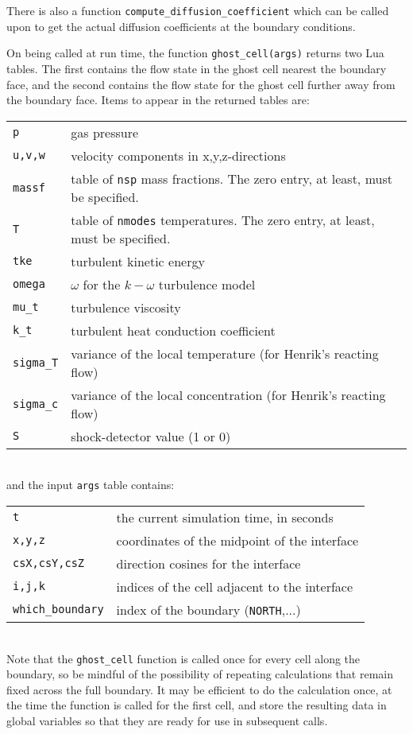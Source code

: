 \noindent
There is also a function \texttt{compute\_diffusion\_coefficient} which can be called upon
to get the actual diffusion coefficients at the boundary conditions.

\medskip
On being called at run time, the function \texttt{ghost\_cell(args)} returns two Lua tables. 
The first contains the flow state in the ghost cell nearest the boundary face, 
and the second contains the flow state for the ghost cell further away from the boundary face.
Items to appear in the returned tables are:\\
\begin{tabular}{lp{12cm}}
 \texttt{p} &  gas pressure \\
 \texttt{u,v,w} & velocity components in x,y,z-directions \\
 \texttt{massf} & table of \texttt{nsp} mass fractions. The zero entry, at least, must be specified. \\
 \texttt{T} & table of \texttt{nmodes} temperatures. The zero entry, at least, must be specified. \\
 \texttt{tke} &  turbulent kinetic energy \\
 \texttt{omega} &  $\omega$ for the $k-\omega$ turbulence model \\
 \texttt{mu\_t} &  turbulence viscosity \\
 \texttt{k\_t} &  turbulent heat conduction coefficient \\
 \texttt{sigma\_T} & variance of the local temperature (for Henrik's reacting flow) \\
 \texttt{sigma\_c} & variance of the local concentration (for Henrik's reacting flow) \\
 \texttt{S} & shock-detector value (1 or 0) \\
\end{tabular}\\
and the input \texttt{args} table contains:\\
\begin{tabular}{lp{12cm}}
 \texttt{t} &  the current simulation time, in seconds \\
 \texttt{x,y,z} &  coordinates of the midpoint of the interface\\
 \texttt{csX,csY,csZ} &  direction cosines for the interface\\
 \texttt{i,j,k} &  indices of the cell adjacent to the interface\\
 \texttt{which\_boundary} & index of the boundary (\texttt{NORTH},...) \\
\end{tabular}\\
Note that the \texttt{ghost\_cell} function is called once for every cell along the boundary,
so be mindful of the possibility of repeating calculations that remain fixed across the full boundary.
It may be efficient to do the calculation once, at the time the function is called for the first cell,
and store the resulting data in global variables so that they are ready for use in subsequent calls. 

